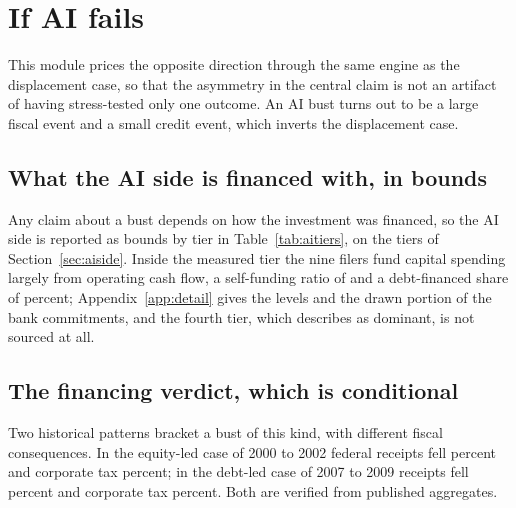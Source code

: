 \section{If AI fails}
\label{sec:bust}

This module prices the opposite direction through the same engine as the displacement case, so
that the asymmetry in the central claim is not an artifact of having stress-tested only one
outcome. An AI bust turns out to be a large fiscal event and a small credit event, which inverts
the displacement case.

\subsection{What the AI side is financed with, in bounds}

Any claim about a bust depends on how the investment was financed, so the AI side is reported as
bounds by tier in Table~\ref{tab:aitiers}, on the tiers of Section~\ref{sec:aiside}. Inside the
measured tier the nine filers fund capital spending largely from operating cash flow, a
self-funding ratio of  and a debt-financed share of
 percent; Appendix~\ref{app:detail} gives the levels and the drawn
portion of the bank commitments, and the fourth tier, which \citet{BIS2026} describes as dominant,
is not sourced at all.

\begin{table}[htbp]
\centering
\caption{The AI side by tier of evidence. Tier 1 is measured from filings and is a lower bound on
the total; tier 4 is unsourced and is the hole the financing verdict turns on. Cells with no
sourced value read n/a.}
\label{tab:aitiers}

\end{table}

\subsection{The financing verdict, which is conditional}

Two historical patterns bracket a bust of this kind, with different fiscal consequences. In the
equity-led case of 2000 to 2002 federal receipts fell  percent and
corporate tax  percent; in the debt-led case of 2007 to 2009 receipts
fell  percent and corporate tax  percent.
Both are verified from published aggregates.

